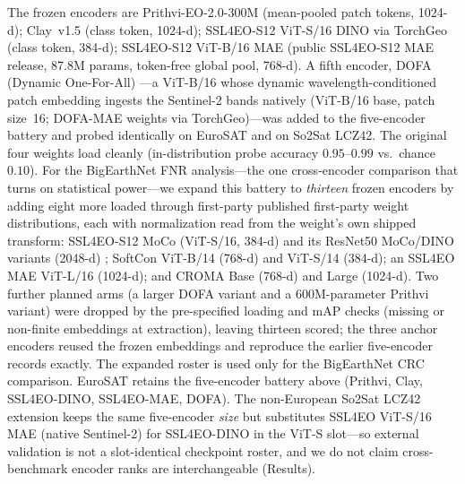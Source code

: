 \documentclass[preprint,11pt,authoryear]{elsarticle}
\begin{document}
The frozen encoders are Prithvi-EO-2.0-300M \citep{szwarcman2024prithvi} (mean-pooled patch tokens, 1024-d); Clay~v1.5 \citep{clay2024model}
(class token, 1024-d); SSL4EO-S12 \citep{wang2023ssl4eo} ViT-S/16 DINO via TorchGeo (class token, 384-d); SSL4EO-S12 \citep{wang2023ssl4eo} ViT-B/16 MAE
(public SSL4EO-S12 MAE release, 87.8M params, token-free global pool, 768-d). A fifth
encoder, DOFA (Dynamic One-For-All) \citep{xiong2024dofa}---a ViT-B/16 whose dynamic
wavelength-conditioned patch embedding ingests the Sentinel-2 bands natively (ViT-B/16 base, patch size~16;
DOFA-MAE weights via TorchGeo)---was added to the five-encoder battery and probed
identically on EuroSAT and on So2Sat LCZ42. The original four weights load cleanly (in-distribution probe accuracy
$0.95$--$0.99$ vs.\ chance $0.10$).
For the BigEarthNet FNR analysis---the one cross-encoder comparison that turns on statistical power---we
expand this battery to \emph{thirteen} frozen encoders by adding eight more loaded through first-party
published first-party weight distributions, each with normalization read from the weight's own shipped transform: SSL4EO-S12 MoCo
(ViT-S/16, 384-d) and its ResNet50 MoCo/DINO variants (2048-d) \citep{wang2023ssl4eo}; SoftCon
\citep{wang2024softcon} ViT-B/14 (768-d) and ViT-S/14 (384-d); an SSL4EO MAE ViT-L/16 (1024-d); and
CROMA \citep{fuller2023croma} Base (768-d) and Large (1024-d). Two further planned arms
(a larger DOFA variant and a 600M-parameter Prithvi variant) were dropped by the pre-specified loading and mAP checks (missing
or non-finite embeddings at extraction), leaving thirteen scored; the three anchor encoders reused
the frozen embeddings and reproduce the earlier five-encoder records exactly. The expanded roster is used
only for the BigEarthNet CRC comparison. EuroSAT retains the five-encoder battery above
(Prithvi, Clay, SSL4EO-DINO, SSL4EO-MAE, DOFA). The non-European So2Sat LCZ42 extension keeps the
same five-encoder \emph{size} but substitutes SSL4EO ViT-S/16 MAE (native Sentinel-2) for
SSL4EO-DINO in the ViT-S slot---so external validation is not a slot-identical checkpoint
roster, and we do not claim cross-benchmark encoder ranks are interchangeable (Results).
\end{document}
